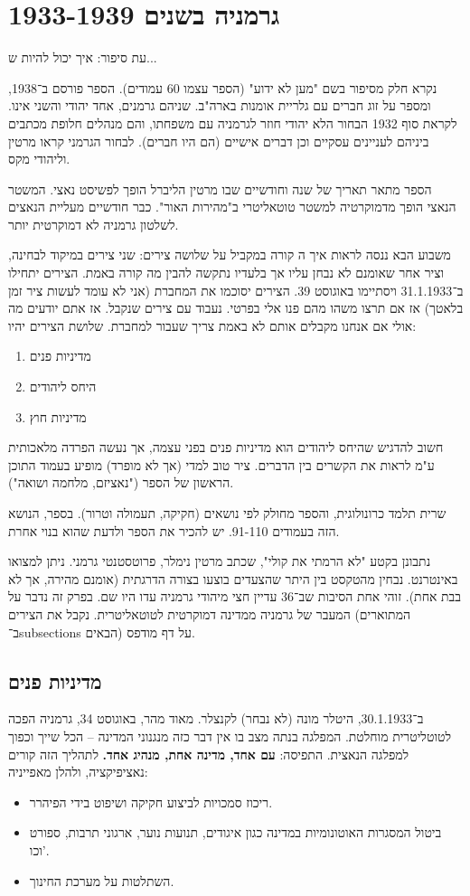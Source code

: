 \documentclass[a4paper]{book}
\begin{document}
	
	\section{גרמניה בשנים 1933-1939}
	
	עת סיפור: איך יכול להיות ש...
	
	נקרא חלק מסיפור בשם "מען לא ידוע" (הספר עצמו 60 עמודים). הספר פורסם ב־1938, ומספר על זוג חברים עם גלריית אומנות בארה"ב. שניהם גרמנים, אחד יהודי והשני אינו. לקראת סוף 1932 הבחור הלא יהודי חוזר לגרמניה עם משפחתו, והם מנהלים חלופת מכתבים ביניהם לעניינים עסקיים וכן דברים אישיים (הם היו חברים). לבחור הגרמני קראו מרטין וליהודי מקס. 
	
	הספר מתאר תאריך של שנה וחודשיים שבו מרטין הליברל הופך לפשיסט נאצי. המשטר הנאצי הופך מדמוקרטיה למשטר טוטאליטרי ב"מהירות האור". כבר חודשיים מעליית הנאצים לשלטון גרמניה לא דמוקרטית יותר. 
	
	משבוע הבא ננסה לראות איך ה קורה במקביל על שלושה צירים: שני צירים במיקוד לבחינה, וציר אחר שאומנם לא נבחן עליו אך בלעדיו נתקשה להבין מה קורה באמת. הצירים יתחילו ב־31.1.1933 ויסתיימו באוגוסט 39. הצירים יסוכמו את המחברת (אני לא עומד לעשות ציר זמן בלאטך) אז אם תרצו משהו מהם פנו אלי בפרטי. נעבוד עם צירים שנקבל. אז אתם יודעים מה אולי אם אנחנו מקבלים אותם לא באמת צריך שעבור למחברת. שלושת הצירים יהיו: 
	\begin{enumerate}
		\item מדיניות פנים
		\item היחס ליהודים
		\item מדיניות חוץ
	\end{enumerate}
	חשוב להדגיש שהיחס ליהודים הוא מדיניות פנים בפני עצמה, אך נעשה הפרדה מלאכותית ע"מ לראות את הקשרים בין הדברים. ציר טוב למדי (אך לא מופרד) מופיע בעמוד התוכן הראשון של הספר ("נאציזם, מלחמה ושואה"). 
	
	שרית תלמד כרונולוגית, והספר מחולק לפי נושאים (חקיקה, תעמולה וטרור). בספר, הנושא הזה בעמודים 91-110. יש להכיר את הספר ולדעת שהוא בנוי אחרת. 
	
	נתבונן בקטע "לא הרמתי את קולי", שכתב מרטין נימלר, פרוטסטנטי גרמני. ניתן למצואו באינטרנט. נבחין מהטקסט בין היתר שהצעדים בוצעו בצורה הדרגתית (אומנם מהירה, אך לא בבת אחת). זוהי אחת הסיבות שב־36 עדיין חצי מיהודי גרמניה עדו היו שם. בפרק זה נדבר על המעבר של גרמניה ממדינה דמוקרטית לטוטאליטרית. 
	נקבל את הצירים (המתוארים ב־subsections הבאים) על דף מודפס. 
	
	\subsection{מדיניות פנים}
	ב־30.1.1933, היטלר מונה (לא נבחר) לקנצלר. מאוד מהר, באוגוסט 34, גרמניה הפכה לטוטליטרית מוחלטת. המפלגה בנתה מצב בו אין דבר כזה מנגנוני המדינה – הכל שייך וכפוך למפלגה הנאצית. התפיסה: \textbf{עם אחד, מדינה אחת, מנהיג אחד. }לתהליך הזה קורים נאציפיקציה, ולהלן מאפייניה: 
	\begin{itemize}
		\item ריכוז סמכויות לביצוע חקיקה ושיפוט בידי הפיהרר. 
		\item ביטול המסגרות האוטונומיות במדינה כגון איגודים, תנועות נוער, ארגוני תרבות, ספורט וכו'. 
		\item השתלטות על מערכת החינוך. 
	\end{itemize}
	
\end{document}
